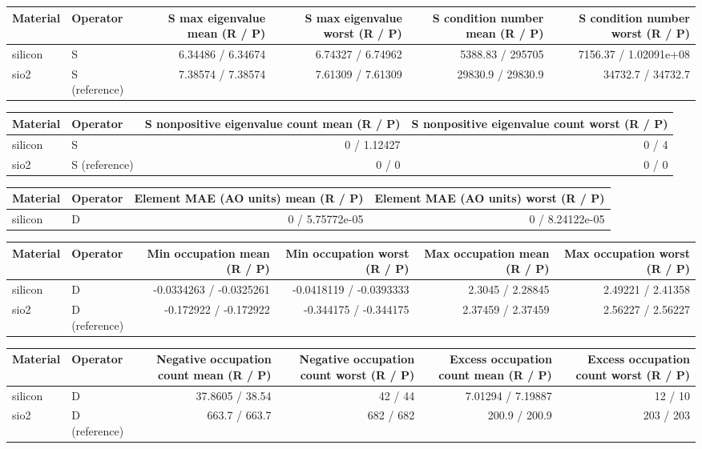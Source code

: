 \begin{tabular}{llrrrr}
\toprule
Material & Operator & S max eigenvalue mean (R / P) & S max eigenvalue worst (R / P) & S condition number mean (R / P) & S condition number worst (R / P) \\
\midrule
silicon & S & 6.34486 / 6.34674 & 6.74327 / 6.74962 & 5388.83 / 295705 & 7156.37 / 1.02091e+08 \\
sio2 & S (reference) & 7.38574 / 7.38574 & 7.61309 / 7.61309 & 29830.9 / 29830.9 & 34732.7 / 34732.7 \\
\bottomrule
\end{tabular}
\begin{tabular}{llrr}
\toprule
Material & Operator & S nonpositive eigenvalue count mean (R / P) & S nonpositive eigenvalue count worst (R / P) \\
\midrule
silicon & S & 0 / 1.12427 & 0 / 4 \\
sio2 & S (reference) & 0 / 0 & 0 / 0 \\
\bottomrule
\end{tabular}
\begin{tabular}{llrr}
\toprule
Material & Operator & Element MAE (AO units) mean (R / P) & Element MAE (AO units) worst (R / P) \\
\midrule
silicon & D & 0 / 5.75772e-05 & 0 / 8.24122e-05 \\
\bottomrule
\end{tabular}
\begin{tabular}{llrrrr}
\toprule
Material & Operator & Min occupation mean (R / P) & Min occupation worst (R / P) & Max occupation mean (R / P) & Max occupation worst (R / P) \\
\midrule
silicon & D & -0.0334263 / -0.0325261 & -0.0418119 / -0.0393333 & 2.3045 / 2.28845 & 2.49221 / 2.41358 \\
sio2 & D (reference) & -0.172922 / -0.172922 & -0.344175 / -0.344175 & 2.37459 / 2.37459 & 2.56227 / 2.56227 \\
\bottomrule
\end{tabular}
\begin{tabular}{llrrrr}
\toprule
Material & Operator & Negative occupation count mean (R / P) & Negative occupation count worst (R / P) & Excess occupation count mean (R / P) & Excess occupation count worst (R / P) \\
\midrule
silicon & D & 37.8605 / 38.54 & 42 / 44 & 7.01294 / 7.19887 & 12 / 10 \\
sio2 & D (reference) & 663.7 / 663.7 & 682 / 682 & 200.9 / 200.9 & 203 / 203 \\
\bottomrule
\end{tabular}
